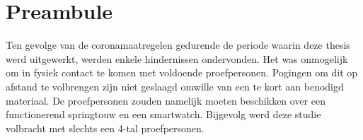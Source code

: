 \chapter*{Preambule}
Ten gevolge van de coronamaatregelen gedurende de periode waarin deze thesis werd uitgewerkt, werden enkele hindernissen ondervonden. Het was onmogelijk om in fysiek contact te komen met voldoende proefpersonen. Pogingen om dit op afstand te volbrengen zijn niet geslaagd omwille van een te kort aan benodigd materiaal. De proefpersonen zouden namelijk moeten beschikken over een functionerend springtouw en een smartwatch. Bijgevolg werd deze studie volbracht met slechts een 4-tal proefpersonen.
